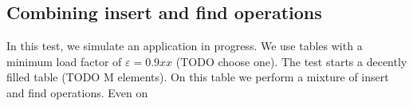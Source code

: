 \documentclass[a4paper,UKenglish]{lipics-v2016}
\begin{document}
\subsection{Combining insert and find operations}
In this test, we simulate an application in progress.  We use tables
with a minimum load factor of $\varepsilon = 0.9xx$ (TODO choose one).
The test starts a decently filled table (TODO M elements).  On this
table we perform a mixture of insert and find operations.  Even on








\end{document}
